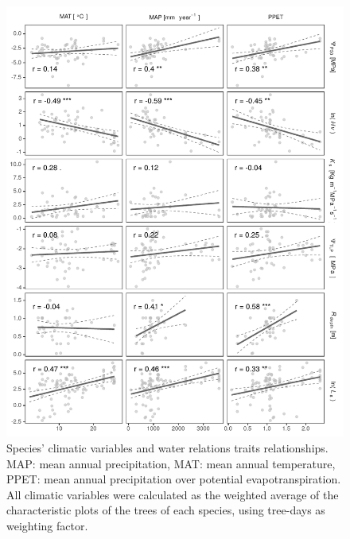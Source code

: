 \documentclass[11pt,twoside]{reedthesis}
\begin{document}
\begin{figure}[H]

{\centering \includegraphics[width=1\linewidth]{figure/appendixD/fig7} 

}

\caption{Species' climatic variables and water relations traits relationships. MAP: mean annual precipitation, MAT: mean annual temperature, PPET: mean annual precipitation over potential evapotranspiration. All climatic variables were calculated as the weighted average of the characteristic plots of the trees of each species, using tree-days as weighting factor.}\label{fig:climatetraitsplot}
\end{figure}
\end{document}
